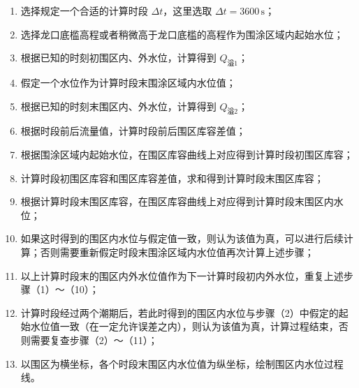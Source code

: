 \documentclass[UTF8, a4paper, 12pt]{ctexart} %
\begin{document}
\begin{enumerate}
    \item 选择规定一个合适的计算时段 $\Delta t$，这里选取 $\Delta t = 3600\,\text{s}$；
    \item 选择龙口底槛高程或者稍微高于龙口底槛的高程作为围涂区域内起始水位；
    \item 根据已知的时刻初围区内、外水位，计算得到 $Q_{\text{溢1}}$；
    \item 假定一个水位作为计算时段末围涂区域内水位值；
    \item 根据已知的时刻末围区内、外水位，计算得到 $Q_{\text{溢2}}$；
    \item 根据时段前后流量值，计算时段前后围区库容差值；
    \item 根据围涂区域内起始水位，在围区库容曲线上对应得到计算时段初围区库容；
    \item 计算时段初围区库容和围区库容差值，求和得到计算时段末围区库容；
    \item 根据计算时段末围区库容，在围区库容曲线上对应得到计算时段末围区内水位；
    \item 如果这时得到的围区内水位与假定值一致，则认为该值为真，可以进行后续计算；否则需要重新假定时段末围涂区域内水位值再次计算上述步骤；
    \item 以上计算时段末的围区内外水位值作为下一计算时段初内外水位，重复上述步骤（1）～（10）；
    \item 计算时段经过两个潮期后，若此时得到的围区内水位与步骤（2）中假定的起始水位值一致（在一定允许误差之内），则认为该值为真，计算过程结束，否则需要复查步骤（2）～（11）；
    \item 以围区为横坐标，各个时段末围区内水位值为纵坐标，绘制围区内水位过程线。
\end{enumerate}
\end{document}
